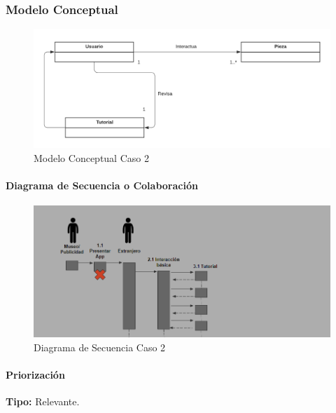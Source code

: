 \subsubsection{Modelo Conceptual}

\begin{figure}[H]
\centerline{\includegraphics[width=15cm]{imgs/ModeloConceptualCaso_2_3.png}}
\caption{Modelo Conceptual Caso 2}
\label{fig_2_2}
\end{figure}

\paragraph{Diagrama de Secuencia o Colaboración}

\begin{figure}[H]
\centerline{\includegraphics[width=15cm]{imgs/CasoUso_2_2.PNG}}
\caption{Diagrama de Secuencia Caso 2}
\label{fig_2_3}
\end{figure}

\paragraph{Priorización}
{\textbf {Tipo:}}
Relevante.